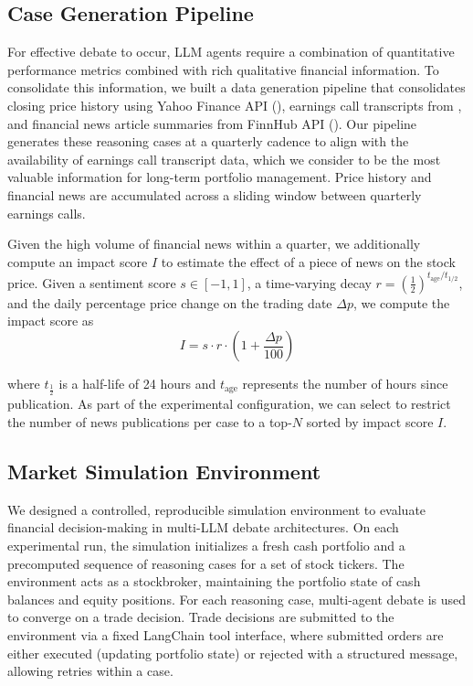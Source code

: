 \documentclass{article}
\begin{document}
\subsection{Case Generation Pipeline}
For effective debate to occur, LLM agents require a combination of quantitative performance metrics combined with rich qualitative financial information. To consolidate this information, we built a data generation pipeline that consolidates closing price history using Yahoo Finance API (\cite{yahoofinance}), earnings call transcripts from \cite{earnings-transcripts-dataset}, and financial news article summaries from FinnHub API (\cite{finnhub_api}). Our pipeline generates these reasoning cases at a quarterly cadence to align with the availability of earnings call transcript data, which we consider to be the most valuable information for long-term portfolio management. Price history and financial news are accumulated across a sliding window between quarterly earnings calls. 

Given the high volume of financial news within a quarter, we additionally compute an impact score  $I$ to estimate the effect of a piece of news on the stock price. Given a sentiment score $s \in \left[-1,1\right]$, a time-varying decay $r = (\frac{1}{2})^{t_\text{age} / t_{1/2}}$, and the daily percentage price change on the trading date $\Delta p$, we compute the impact score as
\begin{equation}
I = s \cdot r \cdot \left(1 + \frac{\Delta p}{100}\right)
\end{equation}

where $t_{\frac{1}{2}}$ is a half-life of 24 hours and $t_\text{age}$ represents the number of hours since publication. As part of the experimental configuration, we can select to restrict the number of news publications per case to a top-$N$ sorted by impact score $I$.

\subsection{Market Simulation Environment}
We designed a controlled, reproducible simulation environment to evaluate financial decision-making in multi-LLM debate architectures. On each experimental run, the simulation initializes a fresh cash portfolio and a precomputed sequence of reasoning cases for a set of stock tickers. The environment acts as a stockbroker, maintaining  the portfolio state of cash balances and equity positions. For each reasoning case, multi-agent debate is used to converge on a trade decision. Trade decisions are submitted to the environment via a fixed LangChain tool interface, where submitted orders are either executed (updating portfolio state) or rejected with a structured message, allowing retries within a case.
\end{document}

